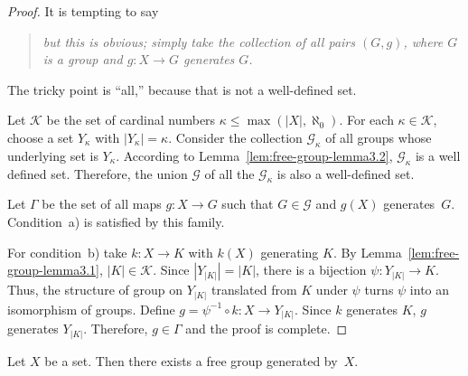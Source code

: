 \begin{proof}It is tempting to say
    \begin{quote}\small
        \textit{but this is obvious; simply take the collection of all pairs\/ $(G, g)$, where\/ $G$ is a group and\/ $g\colon X\to G$ generates\/ $G$.}
    \end{quote}
    The tricky point is ``all,'' because that is not a well-defined set.

    Let $\mathcal K$ be the set of cardinal numbers $\kappa\le\max(|X|,\aleph_0)$. For each $\kappa\in\mathcal K$, choose a set $Y_\kappa$ with $|Y_\kappa|=\kappa$. Consider the collection $\mathcal G_\kappa$ of all groups whose underlying set is $Y_\kappa$. According to Lemma~\ref{lem:free-group-lemma3.2}, $\mathcal G_\kappa$ is a well defined set. Therefore, the union $\mathcal G$ of all the $\mathcal G_\kappa$ is also a well-defined set.

    Let $\Gamma$ be the set of all maps $g\colon X\to G$ such that $G\in\mathcal G$ and $g(X)$ generates~$G$. Condition~a) is satisfied by this family.

    For condition~b) take $k\colon X\to K$ with $k(X)$ generating $K$. By Lemma~\ref{lem:free-group-lemma3.1}, $|K|\in\mathcal K$. Since $|Y_{|K|}|=|K|$, there is a bijection $\psi\colon Y_{|K|}\to K$. Thus, the structure of group on $Y_{|K|}$ translated from $K$ under $\psi$ turns $\psi$ into an isomorphism of groups. Define $g=\psi^{-1}\circ k\colon X\to Y_{|K|}$. Since $k$ generates $K$, $g$ generates $Y_{|K|}$. Therefore, $g\in\Gamma$ and the proof is complete.
\end{proof}


\begin{thm}\label{thm:free-group-existence}
    Let $X$ be a set. Then there exists a free group generated by~$X$.
\end{thm}


